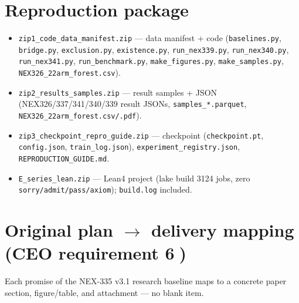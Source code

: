 \documentclass[11pt]{article}
\begin{document}
\section{Reproduction package}
\label{app:repro}
\begin{itemize}
\item \texttt{zip1\_code\_data\_manifest.zip} --- data manifest + code
(\texttt{baselines.py}, \texttt{bridge.py}, \texttt{exclusion.py},
\texttt{existence.py}, \texttt{run\_nex339.py}, \texttt{run\_nex340.py},
\texttt{run\_nex341.py}, \texttt{run\_benchmark.py}, \texttt{make\_figures.py},
\texttt{make\_samples.py}, \texttt{NEX326\_22arm\_forest.csv}).
\item \texttt{zip2\_results\_samples.zip} --- result samples + JSON
(NEX326/337/341/340/339 result JSONs, \texttt{samples\_*.parquet},
\texttt{NEX326\_22arm\_forest.csv/.pdf}).
\item \texttt{zip3\_checkpoint\_repro\_guide.zip} --- checkpoint
(\texttt{checkpoint.pt}, \texttt{config.json}, \texttt{train\_log.json}),
\texttt{experiment\_registry.json}, \texttt{REPRODUCTION\_GUIDE.md}.
\item \texttt{E\_series\_lean.zip} --- Lean4 project (lake build 3124 jobs,
zero \texttt{sorry/admit/pass/axiom}); \texttt{build.log} included.
\end{itemize}

\section{Original plan $\to$ delivery mapping (CEO requirement \textcircled{6})}
\label{app:plan}
Each promise of the NEX-335 v3.1 research baseline maps to a concrete paper
section, figure/table, and attachment --- no blank item.
\end{document}
